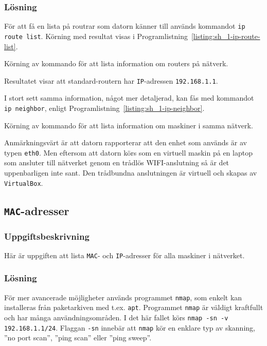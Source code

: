 \subsubsection{Lösning}
För att få en lista på routrar som datorn känner till används kommandot
\texttt{ip route list}.  Körning med resultat visas i
Programlistning~\ref{listing:sh_1-ip-route-list}.

\begin{listing}[H]
  \caption{Körning av kommando för att lista information om routers på
           nätverk.}
  \label{listing:sh_1-ip-route-list}
\end{listing}


Resultatet visar att standard-routern har \texttt{IP}-adressen
\texttt{192.168.1.1}.


I stort sett samma information, något mer detaljerad, kan fås med kommandot
\texttt{ip neighbor}, enligt Programlistning~\ref{listing:sh_1-ip-neighbor}.

\begin{listing}[H]
  \caption{Körning av kommando för att lista information om maskiner i samma
           nätverk.}
  \label{listing:sh_1-ip-neighbor}
\end{listing}

Anmärkningsvärt är att datorn rapporterar att den enhet som används är av typen
\texttt{eth0}.  Men eftersom att datorn körs som en virtuell maskin på en
laptop som ansluter till nätverket genom en trådlös WIFI-anslutning så är det
uppenbarligen inte sant.  Den trådbundna anslutningen är virtuell och skapas av
\texttt{VirtualBox}.



\subsection{\texttt{MAC}-adresser}
\subsubsection{Uppgiftsbeskrivning}
Här är uppgiften att lista \texttt{MAC}- och \texttt{IP}-adresser för alla
maskiner i nätverket.


\subsubsection{Lösning}
För mer avancerade möjligheter används programmet \texttt{nmap}, som enkelt kan
installeras från paketarkiven med t.ex. \texttt{apt}.  Programmet \texttt{nmap}
är väldigt kraftfullt och har många användningsområden.  I det här fallet körs
\texttt{nmap -sn -v 192.168.1.1/24}.  Flaggan \texttt{-sn} innebär att
\texttt{nmap} kör en enklare typ av skanning, ''no port scan'', ''ping scan''
eller ''ping sweep''.

